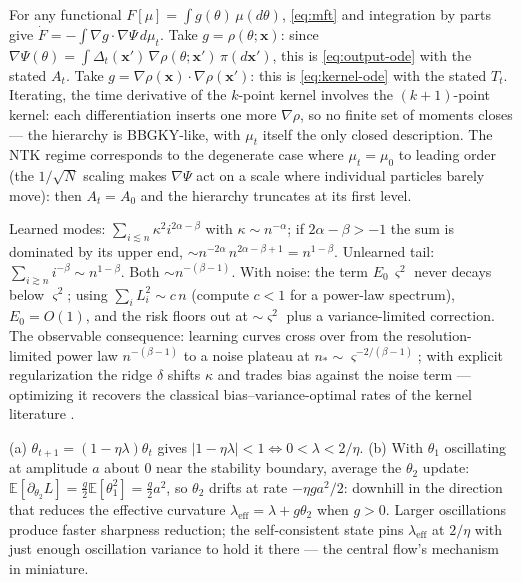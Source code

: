 \documentclass[11pt]{article}
\newcommand{\E}{\mathbb{E}}
\newcommand{\bv}[1]{\boldsymbol{#1}}
\begin{document}
\begin{solution}
For any functional $F[\mu] = \int g(\theta)\,\mu(d\theta)$,
\cref{eq:mft} and integration by parts give $\dot F = -\int
\nabla g\cdot\nabla\Psi\, d\mu_t$. Take $g = \rho(\theta;\bv{x})$: since
$\nabla\Psi(\theta) = \int \Delta_t(\bv{x}')\,\nabla\rho(\theta;\bv{x}')\,
\pi(d\bv{x}')$, this is \cref{eq:output-ode} with the stated $A_t$. Take
$g = \nabla\rho(\bv{x})\cdot\nabla\rho(\bv{x}')$: this is
\cref{eq:kernel-ode} with the stated $T_t$. Iterating, the time derivative
of the $k$-point kernel involves the $(k+1)$-point kernel: each
differentiation inserts one more $\nabla\rho$, so no finite set of moments
closes --- the hierarchy is BBGKY-like, with $\mu_t$ itself the only closed
description. The NTK regime corresponds to the degenerate case where
$\mu_t = \mu_0$ to leading order (the $1/\sqrt N$ scaling makes
$\nabla\Psi$ act on a scale where individual particles barely move):
then $A_t = A_0$ and the hierarchy truncates at its first level.
\end{solution}

\begin{solution}[ex:scaling]
Learned modes: $\sum_{i \lesssim n} \kappa^2 i^{2\alpha - \beta}$ with
$\kappa \sim n^{-\alpha}$; if $2\alpha - \beta > -1$ the sum is dominated
by its upper end, $\sim n^{-2\alpha}\, n^{2\alpha - \beta + 1} =
n^{1-\beta}$. Unlearned tail: $\sum_{i \gtrsim n} i^{-\beta} \sim
n^{1-\beta}$. Both $\sim n^{-(\beta - 1)}$. With noise: the term
$E_0\,\varsigma^2$ never decays below $\varsigma^2$; using $\sum_i L_i^2
\sim c\,n$ (compute $c < 1$ for a power-law spectrum), $E_0 = O(1)$, and
the risk floors out at $\sim \varsigma^2$ plus a variance-limited
correction. The observable consequence: learning curves cross over from the
resolution-limited power law $n^{-(\beta-1)}$ to a noise plateau at
$n_* \sim \varsigma^{-2/(\beta-1)}$; with explicit regularization the ridge
$\delta$ shifts $\kappa$ and trades bias against the noise term ---
optimizing it recovers the classical bias--variance-optimal rates of the
kernel literature \cite{cui2023error}.
\end{solution}

\begin{solution}[ex:eos]
(a) $\theta_{t+1} = (1-\eta\lambda)\theta_t$ gives $|1-\eta\lambda| < 1
\iff 0 < \lambda < 2/\eta$. (b) With $\theta_1$ oscillating at amplitude
$a$ about $0$ near the stability boundary, average the $\theta_2$ update:
$\E[\partial_{\theta_2} L] = \tfrac{g}{2}\E[\theta_1^2] =
\tfrac{g}{2}a^2$, so $\theta_2$ drifts at rate $-\eta g a^2/2$: downhill
in the direction that reduces the effective curvature
$\lambda_{\mathrm{eff}} = \lambda + g\theta_2$ when $g > 0$. Larger
oscillations produce faster sharpness reduction; the self-consistent state
pins $\lambda_{\mathrm{eff}}$ at $2/\eta$ with just enough oscillation
variance to hold it there --- the central flow's mechanism in miniature.
\end{solution}



\end{document}
